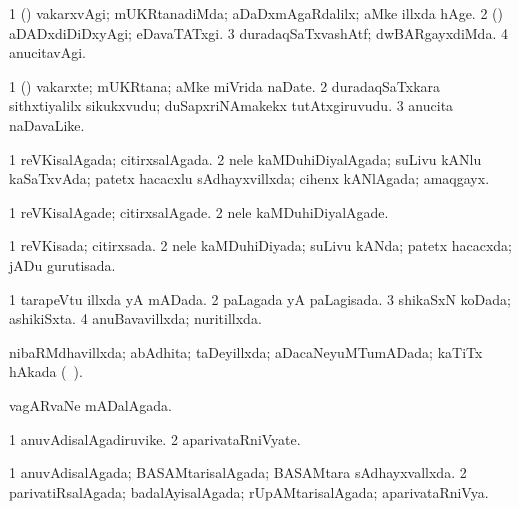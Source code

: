 {{\bentry
{} 
\gl{\kirxvi}
\expl{}
\bmng
\bnum
\num{1} (\pArxparx) vakarxvAgi; mUKRtanadiMda; aDaDxmAgaRdalilx; aMke illxda hAge. 
\num{2} (\gaparx) aDADxdiDiDxyAgi; eDavaTATxgi. 
\num{3} duradaqSaTxvashAtf; dwBARgayxdiMda. 
\num{4} anucitavAgi. 
\enum
\emng
\eentry

\bentry
{} 
\gl{\nA}
\expl{}
\bmng
\bnum
\num{1} (\pArxparx) vakarxte; mUKRtana; aMke miVrida naDate. 
\num{2} duradaqSaTxkara sithxtiyalilx sikukxvudu; duSapxriNAmakekx tutAtxgiruvudu. 
\num{3} anucita naDavaLike. 
\enum
\emng
\eentry

\bentry
{} 
\gl{\gu}
\expl{}
\bmng
\bnum
\num{1} reVKisalAgada; citirxsalAgada. 
\num{2} nele kaMDuhiDiyalAgada; suLivu kANlu kaSaTxvAda; patetx hacacxlu sAdhayxvillxda; cihenx kANlAgada; amaqgayx. 
\enum
\emng
\eentry

\bentry
{} 
\gl{\kirxvi}
\expl{}
\bmng
\bnum
\num{1} reVKisalAgade; citirxsalAgade. 
\num{2} nele kaMDuhiDiyalAgade. 
\enum
\emng
\eentry

\bentry
{} 
\gl{\gu}
\expl{}
\bmng
\bnum
\num{1} reVKisada; citirxsada. 
\num{2} nele kaMDuhiDiyada; suLivu kANda; patetx hacacxda; jADu gurutisada. 
\enum
\emng
\eentry

\bentry
{} 
\gl{\gu}
\expl{}
\bmng
\bnum
\num{1} tarapeVtu illxda yA mADada. 
\num{2} paLagada yA paLagisada. 
\num{3} shikaSxN koDada; ashikiSxta. 
\num{4} anuBavavillxda; nuritillxda. 
\enum
\emng
\eentry

\bentry
{} 
\gl{\gu}
\expl{}
\bmng
nibaRMdhavillxda; abAdhita; taDeyillxda; aDacaNeyuMTumADada; kaTiTx hAkada (\sA\ \rUpa). 
\emng
\eentry

\bentry
{} 
\gl{\gu}
\expl{}
\bmng
vagARvaNe mADalAgada. 
\emng
\eentry

\bentry
{} 
\gl{\nA}
\expl{}
\bmng
\bnum
\num{1} anuvAdisalAgadiruvike. 
\num{2} aparivataRniVyate. 
\enum
\emng
\eentry

\bentry
{} 
\gl{\gu}
\expl{}
\bmng
\bnum
\num{1} anuvAdisalAgada; BASAMtarisalAgada; BASAMtara sAdhayxvallxda. 
\num{2} parivatiRsalAgada; badalAyisalAgada; rUpAMtarisalAgada; aparivataRniVya. 
\enum
\emng
\eentry

}}
